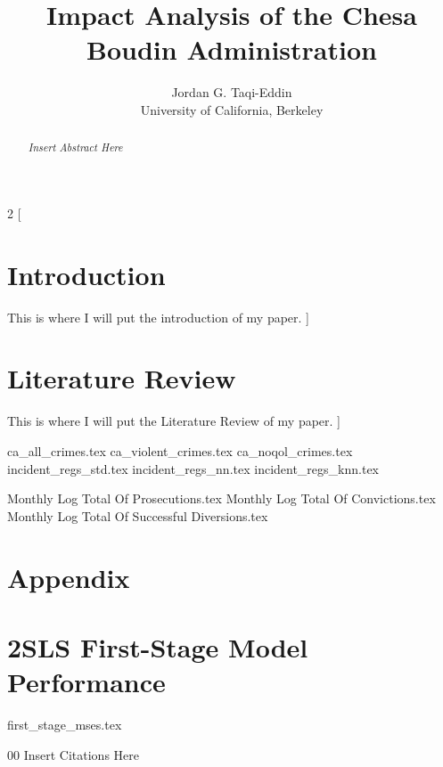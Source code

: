 \documentclass[a4paper]{article}
\title{Impact Analysis of the Chesa Boudin Administration}
\author{Jordan G. Taqi-Eddin\\
        \small University of California, Berkeley\\
}
\date{} %
\begin{document}
\maketitle

\begin{abstract}
\textit{Insert Abstract Here} \\
\blindtext
\end{abstract} \hspace{10pt}


\begin{multicols}{2}
[
\section{Introduction}
This is where I will put the introduction of my paper.
]
\blindtext\blindtext\blindtext

\section{Literature Review}
This is where I will put the Literature Review of my paper.
]
\blindtext\blindtext\blindtext
\end{multicols}

{ca_all_crimes.tex}
{ca_violent_crimes.tex}
{ca_noqol_crimes.tex}
{incident_regs_std.tex}
{incident_regs_nn.tex}
{incident_regs_knn.tex}

\newpage
{Monthly Log Total Of Prosecutions.tex}
{Monthly Log Total Of Convictions.tex}
{Monthly Log Total Of Successful Diversions.tex}

\newpage
\appendix
\section*{Appendix}

\section{2SLS First-Stage Model Performance}

{first_stage_mses.tex}

\newpage
\begin{thebibliography}{00}
 Insert Citations Here
\end{thebibliography}

% 
\end{document}
